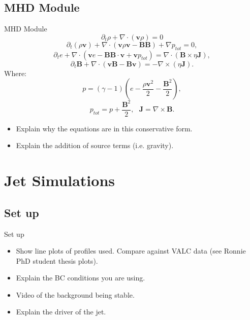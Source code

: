 \documentclass{beamer}
\begin{document}
\subsection{MHD Module}
\begin{frame}
\begin{block}{MHD Module}
\begin{equation}
\partial_t \rho + \nabla \cdot ( \mathbf{v} \rho ) = 0
\end{equation}
\begin{equation}
\partial_t (\rho \mathbf{v})+ \nabla \cdot (\mathbf{v} \rho \mathbf{v} - \mathbf{BB}) + \nabla p_{tot} = 0 ,
\end{equation}
\begin{equation}
\partial_t e + \nabla \cdot (\mathbf{v} e - \mathbf{BB} \cdot \mathbf{v}+\mathbf{v} p_{tot}) = \nabla \cdot (\mathbf{B} \times \eta \mathbf{J} ) ,
\end{equation}
\begin{equation}
\partial_t \mathbf{B} + \nabla \cdot (\mathbf{vB}-\mathbf{Bv}) = - \nabla \times (\eta \mathbf{J}) .
\end{equation}
Where:
\begin{equation}
p = (\gamma -1) \left( e -  \frac{\rho \mathbf{v}^2}{2} - \frac{\mathbf{B}^2}{2} \right) ,
\end{equation}
\begin{equation}
p_{tot} = p + \frac{\mathbf{B}^2}{2}, \ \ \ \mathbf{J} = \nabla \times \mathbf{B}. 
\end{equation}
\begin{itemize}
\item Explain why the equations are in this conservative form. 
\item Explain the addition of source terms (i.e. gravity). 
\end{itemize}
\end{block}
\end{frame}
\section{Jet Simulations}
\subsection{Set up}
\begin{frame}
\begin{block}{Set up}
\begin{itemize}
\item Show line plots of profiles used. Compare against VALC data (see Ronnie PhD student thesis plots).
\item Explain the BC conditions you are using.
\item Video of the background being stable. 
\item Explain the driver of the jet.
\end{itemize}
\end{block}
\end{frame}
\end{document}
